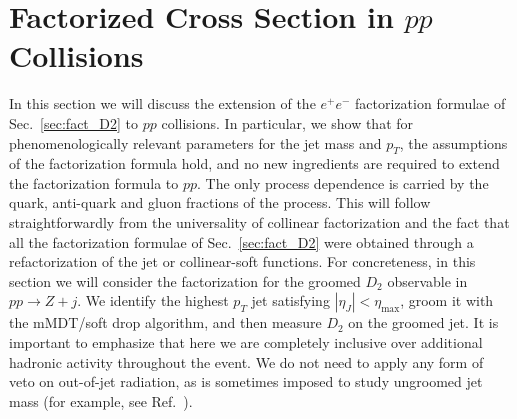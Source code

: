 \documentclass[a4paper,11pt]{article}
\DeclareRobustCommand{\Sec}[1]{Sec.~\ref{#1}}
\DeclareRobustCommand{\Ref}[1]{Ref.~\cite{#1}}
\begin{document}
\section{Factorized Cross Section in $pp$ Collisions}\label{sec:factpp}



In this section we will discuss the extension of the $e^+e^-$ factorization formulae of \Sec{sec:fact_D2} to $pp$ collisions. In particular, we show that for phenomenologically relevant parameters for the jet mass and $p_T$, the assumptions of the factorization formula hold, and no new ingredients are required to extend the factorization formula to $pp$. The only process dependence is carried by the quark, anti-quark and gluon fractions of the process. This will follow straightforwardly from the universality of collinear factorization and the fact that all the factorization formulae of \Sec{sec:fact_D2} were obtained through a refactorization of the jet or collinear-soft functions.  For concreteness, in this section we will consider the factorization for the groomed $D_2$ observable in $pp\to Z+j$.  We identify the highest $p_T$ jet satisfying $|\eta_J|< \eta_{\text{max}}$, groom it with the mMDT/soft drop algorithm, and then measure $D_2$ on the groomed jet. It is important to emphasize that here we are completely inclusive over additional hadronic activity throughout the event. We do not need to apply any form of veto on out-of-jet radiation, as is sometimes imposed to study ungroomed jet mass (for example, see \Ref{Jouttenus:2013hs}).
\end{document}
